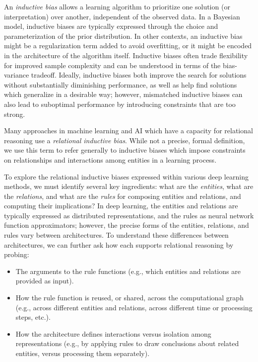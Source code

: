 \documentclass[10pt, onecolumn]{article}
\let\defaultmarginpar\marginpar
\renewcommand\marginpar[2][]{\defaultmarginpar{\itshape\color{gray}#2}}
\begin{document}
An \emph{inductive bias}\marginpar{inductive bias} allows a learning algorithm to prioritize one solution (or interpretation) over another, independent of the observed data. In a Bayesian model, inductive biases are typically expressed through the choice and parameterization of the prior distribution. In other contexts, an inductive bias might be a regularization term added to avoid overfitting, or it might be encoded in the architecture of the algorithm itself. Inductive biases often trade flexibility for improved sample complexity and can be understood in terms of the bias-variance tradeoff. Ideally, inductive biases both improve the search for solutions without substantially diminishing performance, as well as help find solutions which generalize in a desirable way; however, mismatched inductive biases can also lead to suboptimal performance by introducing constraints that are too strong.

Many approaches in machine learning and AI which have a capacity for relational reasoning use a \emph{relational inductive bias}\marginpar{relational inductive bias}. While not a precise, formal definition, we use this term to refer generally to inductive biases  which impose constraints on relationships and interactions among entities in a learning process.

To explore the relational inductive biases expressed within various deep learning methods, we must identify several key ingredients: what are the \emph{entities}, what are the \emph{relations}, and what are the \emph{rules} for composing entities and relations, and computing their implications? In deep learning, the entities and relations are typically expressed as distributed representations, and the rules as neural network function approximators; however, the precise forms of the entities, relations, and rules vary between architectures. To understand these differences between architectures, we can further ask how each supports relational reasoning by probing:
\begin{itemize}
    \item The arguments to the rule functions (e.g., which entities and relations are provided as input).
    \item How the rule function is reused, or shared, across the computational graph (e.g., across different entities and relations, across different time or processing steps, etc.).
    \item How the architecture defines interactions versus isolation among representations (e.g., by applying rules to draw conclusions about related entities, versus processing them separately).
\end{itemize}
\end{document}
